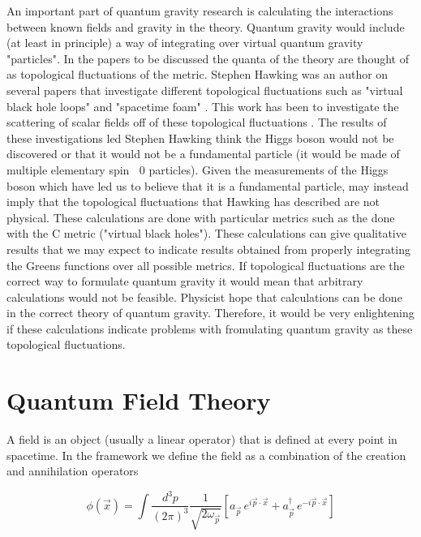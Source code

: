 \documentclass[%
 reprint,
 amsmath,amssymb,
 aps,
]{revtex4-1}
\begin{document}
An important part of quantum gravity research is calculating the interactions between known fields and gravity in the theory. Quantum gravity would include (at least in principle) a way of integrating over virtual quantum gravity "particles". In the papers to be discussed the quanta of the theory are thought of as topological fluctuations of the metric. Stephen Hawking was an author on several papers that investigate different topological fluctuations such as "virtual black hole loops" \cite{virtualblackholes} and "spacetime foam" \cite{spacetimefoam}. This work has been to investigate the scattering of scalar fields off of these topological fluctuations \cite{virtualblackholes} \cite{virtualfoam}. The results of these investigations led Stephen Hawking think the Higgs boson would not be discovered or that it would not be a fundamental particle (it would be made of multiple elementary spin $\>$ 0 particles). Given the measurements of the Higgs boson \cite{higgsboson} which have led us to believe that it is a fundamental particle, may instead imply that the topological fluctuations that Hawking has described are not physical. These calculations are done with particular metrics such as the done with the C metric ("virtual black holes"). These calculations can give qualitative results that we may expect to indicate results obtained from properly integrating the Greens functions over all possible metrics. If topological fluctuations are the correct way to formulate quantum gravity it would mean that arbitrary calculations would not be feasible. Physicist hope that calculations can be done in the correct theory of quantum gravity. Therefore, it would be very enlightening if these calculations indicate problems with fromulating quantum gravity as these topological fluctuations.

\section{Quantum Field Theory}
A field is an object (usually a linear operator) that is defined at every point in spacetime. In the framework we define the field as a combination of the creation and annihilation operators \cite{atchandhey} 

\begin{equation}
\phi(\vec{x}) = \int \frac{d^3 p}{(2\pi)^3} \frac{1}{\sqrt{2\omega_{\vec{p}}}} \left[ a_{\vec{p}} \, e^{ i \vec{p} \cdot \vec{x}} + a_{\vec{p}} ^{\dagger} \, e^{ - i \vec{p} \cdot \vec{x}} \right]
\end{equation}
\end{document}
